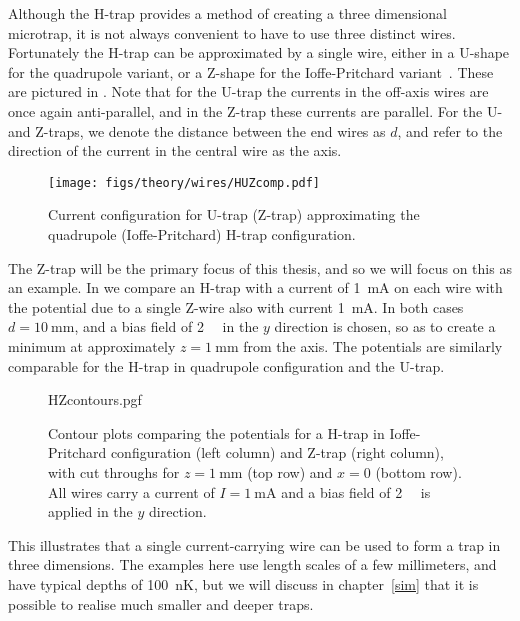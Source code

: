 Although the H-trap provides a method of creating a three dimensional
microtrap, it is not always convenient to have to use three distinct wires.
Fortunately the H-trap can be approximated by a single wire, either in a
U-shape for the quadrupole variant, or a Z-shape for the Ioffe-Pritchard
variant~\cite{2011Ac}. These are pictured in . Note
that for the U-trap the currents in the off-axis wires are once again
anti-parallel, and in the Z-trap these currents are parallel. For the U- and
Z-traps, we denote the distance between the end wires as $d$, and refer
to the direction of the current in the central wire as the axis.

\begin{figure}[htbp]
  \centering
  \texttt{[image: figs/theory/wires/HUZcomp.pdf]}
  \caption[U- and Z-traps]{Current configuration for U-trap (Z-trap)
  approximating the quadrupole (Ioffe-Pritchard) H-trap configuration.}
  \label{theory:fig:HUZ}
\end{figure}

The Z-trap will be the primary focus of this thesis, and so we will focus on
this as an example. In  we compare an H-trap
with a current of \SI{1}{\milli\ampere} on each wire with the potential due to
a single Z-wire also with current \SI{1}{\milli\ampere}. In both cases
$d=\SI{10}{\milli\meter}$, and a bias field of \SI{2}{\milli\gauss} in the $y$
direction is chosen, so as to create a minimum at approximately
$z=\SI{1}{\milli\meter}$ from the axis. The potentials are similarly
comparable for the H-trap in quadrupole configuration and the U-trap.

\begin{figure}[htbp]
  \centering
  {HZcontours.pgf}
  \caption[Comparison of H- and Z-traps]{
    Contour plots comparing the potentials for a H-trap in
    Ioffe-Pritchard configuration (left column) and Z-trap (right column), with
    cut throughs for $z=\SI{1}{\milli\meter}$ (top row) and $x=0$ (bottom row).
    All wires carry a current of $I=\SI{1}{\milli\ampere}$ and a bias field of
    \SI{2}{\milli\gauss} is applied in the $y$ direction.}
  \label{theory:fig:HZcontours}
\end{figure}

This illustrates that a single current-carrying wire can be used to form a trap
in three dimensions. The examples here use length scales of a few millimeters,
and have typical depths of \SI{100}{\nano\kelvin}, but we will discuss in
chapter~\ref{sim} that it is possible to realise much smaller and deeper traps.


